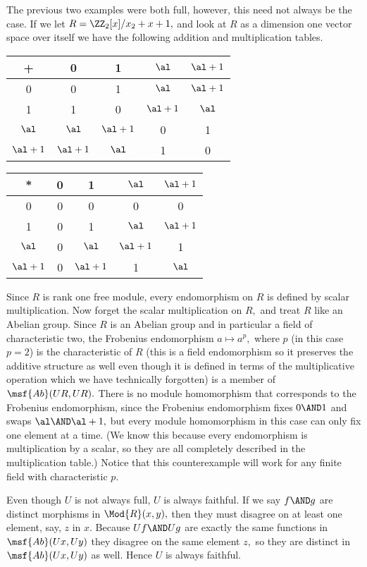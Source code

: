 \documentclass[main.tex]{subfiles}
\begin{document}
	The previous two examples were both full, however, this need not always be the case. If we let $ R=\ZZ_2[x]/x_2+x+1,$ and look at $ R $ as a dimension one vector space over itself we have the following addition and multiplication tables.
	\begin{center}
		\begin{tabular}{|c|c c c c| }
			\hline
			+&0&1&\(\al\)&\(\al+1\)\\
			\hline
			0&0&1&\(\al\)&\(\al+1\)\\
			1&1&0&\(\al+1\)&\(\al\)\\
			\(\al\)&\(\al\)&\(\al+1\)&0&1\\
			\(\al+1\)&\(\al+1\)&\(\al\)&1&0\\
			\hline
		\end{tabular}
			\begin{tabular}{|c|c c c c|}
		\hline
		*&0&1&\(\al\)&\(\al+1\)\\
		\hline
		0&0&0&0&0\\
		1&0&1&\(\al\)&\(\al+1\)\\
		\(\al\)&0&\(\al\)&\(\al+1\)&1\\
		\(\al+1\)&0&\(\al+1\)&1&\(\al\)\\
		\hline
	\end{tabular}
	\end{center}
	Since $ R $ is rank one free module, every endomorphism on $ R $ is defined 
	by scalar multiplication. Now forget the scalar multiplication on $ R,$ and 
	treat $ R $ like an Abelian group. Since $ R $ is an Abelian group and in 
	particular a field of characteristic two, the Frobenius endomorphism $ 
	a\mapsto a^p,$ where $ p $ (in this case $ p=2 $) is the characteristic of $ R $ (this is a field 
	endomorphism so it preserves the additive structure as well even though it 
	is defined in terms of the multiplicative operation which we have 
	technically forgotten) is a member of $ \msf{Ab}(UR,UR).$ There is no 
	module homomorphism that corresponds to the Frobenius 
	endomorphism, since the Frobenius endomorphism fixes $ 0\AND 1 $ and swaps 
	$ \al\AND \al+1,$ but every module homomorphism in this case can only fix 
	one element at a time. (We know this because every endomorphism is 
	multiplication by a scalar, so they are all completely described in the 
	multiplication table.) Notice that this counterexample will work for any 
	finite field with characteristic $ p. $
	
	Even though $U $ is not always full, $ U $ is always faithful. If we say $ 
	f\AND g $ are distinct morphisms in $ \Mod{R}(x,y), $ then they must 
	disagree on at least one element, say, $ z $ in $x.$ Because $ Uf\AND Ug $ are exactly the same functions in $ \msf{Ab}(Ux,Uy) $ they disagree on the same element $ z, $ so they are distinct in $ \msf{Ab}(Ux,Uy) $ as well. Hence $ U $ is always faithful.
 
\end{document}
